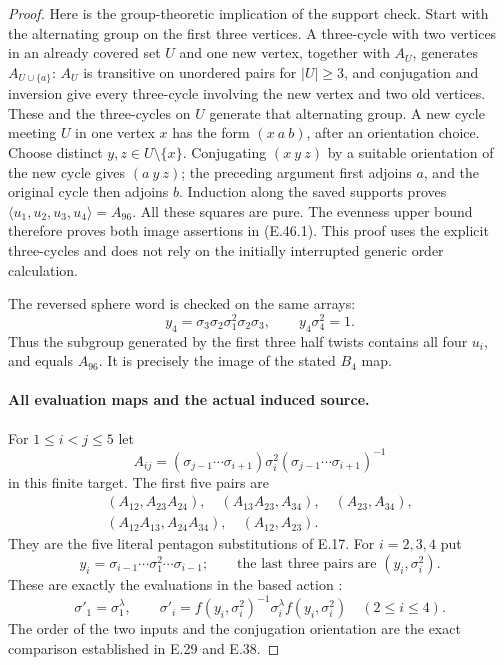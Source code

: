 \begin{proof}
Here is the group-theoretic implication of the support check.
Start with the alternating group on the first three vertices.
A three-cycle with two vertices in an already covered set $U$
and one new vertex, together with $A_U$, generates
$A_{U\cup\{a\}}$: $A_U$ is transitive on unordered pairs
for $|U|\ge3$, and conjugation and inversion give every
three-cycle involving the new vertex and two old vertices.
These and the three-cycles on $U$ generate that alternating
group.  A new cycle meeting $U$ in one vertex $x$ has the
form $(x\ a\ b)$, after an orientation choice.
Choose distinct $y,z\in U\setminus\{x\}$.
Conjugating $(x\ y\ z)$ by a suitable orientation of the
new cycle gives $(a\ y\ z)$; the preceding argument first
adjoins $a$, and the original cycle then adjoins $b$.
Induction along the saved supports proves
$\langle u_1,u_2,u_3,u_4\rangle=A_{96}$.
All these squares are pure.  The evenness upper bound therefore
proves both image assertions in \textup{(E.46.1)}.
This proof uses the explicit three-cycles and does not rely
on the initially interrupted generic order calculation.

The reversed sphere word is checked on the same arrays:
\[
 y_4=\sigma_3\sigma_2\sigma_1^2\sigma_2\sigma_3,
                   \qquad y_4\sigma_4^2=1.
 \tag{E.46.10}
\]
Thus the subgroup generated by the first three half twists
contains all four $u_i$, and equals $A_{96}$.
It is precisely the image of the stated $B_4$ map.

\paragraph{All evaluation maps and the actual induced source.}
For $1\le i<j\le5$ let
\[
 A_{ij}=
 (\sigma_{j-1}\cdots\sigma_{i+1})\sigma_i^2
 (\sigma_{j-1}\cdots\sigma_{i+1})^{-1}
 \tag{E.46.11}
\]
in this finite target.  The first five pairs are
\[
 \begin{gathered}
 (A_{12},A_{23}A_{24}),\quad (A_{13}A_{23},A_{34}),
       \quad (A_{23},A_{34}),\\
 (A_{12}A_{13},A_{24}A_{34}),\quad(A_{12},A_{23}).
 \end{gathered}
 \tag{E.46.12}
\]
They are the five literal pentagon substitutions of E.17.
For $i=2,3,4$ put
\[
 y_i=\sigma_{i-1}\cdots\sigma_1^2\cdots\sigma_{i-1};
 \qquad\text{the last three pairs are }(y_i,\sigma_i^2).
 \tag{E.46.13}
\]
These are exactly the evaluations in the based action
\cite[(1.1)]{BCNakamuraSchneps2000}:
\[
 \sigma'_1=\sigma_1^\lambda,\qquad
 \sigma'_i=f(y_i,\sigma_i^2)^{-1}\sigma_i^\lambda
                     f(y_i,\sigma_i^2)\quad(2\le i\le4).
 \tag{E.46.14}
\]
The order of the two inputs and the conjugation orientation
are the exact comparison established in E.29 and E.38.


\end{proof}
